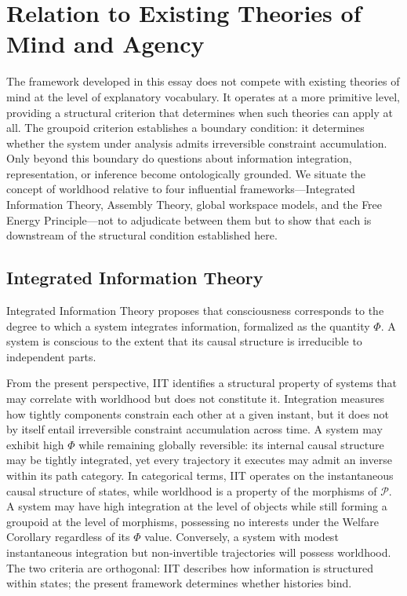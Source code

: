 \documentclass[11pt]{article}
\theoremstyle{definition}
\theoremstyle{remark}
\begin{document}
\section{Relation to Existing Theories of Mind and Agency}

The framework developed in this essay does not compete with existing theories of mind
at the level of explanatory vocabulary. It operates at a more primitive level, providing
a structural criterion that determines when such theories can apply at all. The groupoid
criterion establishes a boundary condition: it determines whether the system under analysis
admits irreversible constraint accumulation. Only beyond this boundary do questions about
information integration, representation, or inference become ontologically grounded. We
situate the concept of worldhood relative to four influential frameworks---Integrated
Information Theory, Assembly Theory, global workspace models, and the Free Energy
Principle---not to adjudicate between them but to show that each is downstream of the
structural condition established here.

\subsection{Integrated Information Theory}

Integrated Information Theory proposes that consciousness corresponds to the degree to
which a system integrates information, formalized as the quantity $\Phi$. A system is
conscious to the extent that its causal structure is irreducible to independent parts.

From the present perspective, IIT identifies a structural property of systems that may
correlate with worldhood but does not constitute it. Integration measures how tightly
components constrain each other at a given instant, but it does not by itself entail
irreversible constraint accumulation across time. A system may exhibit high $\Phi$ while
remaining globally reversible: its internal causal structure may be tightly integrated,
yet every trajectory it executes may admit an inverse within its path category. In
categorical terms, IIT operates on the instantaneous causal structure of states, while
worldhood is a property of the morphisms of $\mathcal{P}$. A system may have high
integration at the level of objects while still forming a groupoid at the level of
morphisms, possessing no interests under the Welfare Corollary regardless of its $\Phi$
value. Conversely, a system with modest instantaneous integration but non-invertible
trajectories will possess worldhood. The two criteria are orthogonal: IIT describes
how information is structured within states; the present framework determines whether
histories bind.
\end{document}
